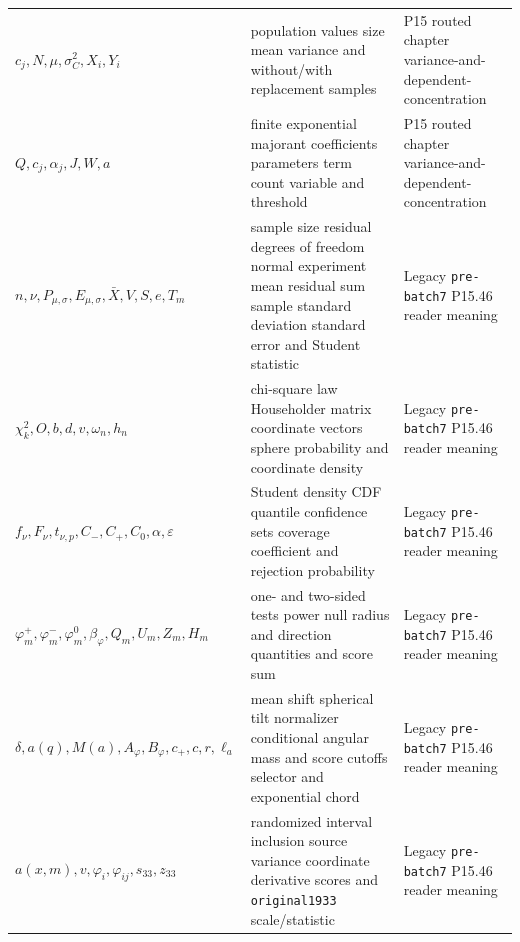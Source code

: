 \begin{longtable}{@{}p{}p{}p{}@{}}
\(c_j,\allowbreak N,\allowbreak \mu,\allowbreak \sigma_C^2,\allowbreak X_i,\allowbreak Y_i\) & population values size mean variance and without/with replacement samples & P15 routed chapter variance-\allowbreak{}and-\allowbreak{}dependent-\allowbreak{}concentration \\
\(Q,\allowbreak c_j,\allowbreak \alpha_j,\allowbreak J,\allowbreak W,\allowbreak a\) & finite exponential majorant coefficients parameters term count variable and threshold & P15 routed chapter variance-\allowbreak{}and-\allowbreak{}dependent-\allowbreak{}concentration \\
\(n,\allowbreak \nu,\allowbreak P_{\mu,\sigma},\allowbreak E_{\mu,\sigma},\allowbreak \bar X,\allowbreak V,\allowbreak S,\allowbreak e,\allowbreak T_m\) & sample size residual degrees of freedom normal experiment mean residual sum sample standard deviation standard error and Student statistic & Legacy \texttt{pre-\allowbreak{}batch7} P15.\allowbreak{}46 reader meaning \\
\(\chi_k^2,\allowbreak O,\allowbreak b,\allowbreak d,\allowbreak v,\allowbreak \omega_n,\allowbreak h_n\) & chi-square law Householder matrix coordinate vectors sphere probability and coordinate density & Legacy \texttt{pre-\allowbreak{}batch7} P15.\allowbreak{}46 reader meaning \\
\(f_\nu,\allowbreak F_\nu,\allowbreak t_{\nu,p},\allowbreak C_-,\allowbreak C_+,\allowbreak C_0,\allowbreak \alpha,\allowbreak \varepsilon\) & Student density CDF quantile confidence sets coverage coefficient and rejection probability & Legacy \texttt{pre-\allowbreak{}batch7} P15.\allowbreak{}46 reader meaning \\
\(\varphi_m^+,\allowbreak \varphi_m^-,\allowbreak \varphi_m^0,\allowbreak \beta_\varphi,\allowbreak Q_m,\allowbreak U_m,\allowbreak Z_m,\allowbreak H_m\) & one- and two-sided tests power null radius and direction quantities and score sum & Legacy \texttt{pre-\allowbreak{}batch7} P15.\allowbreak{}46 reader meaning \\
\(\delta,\allowbreak a(q),\allowbreak M(a),\allowbreak A_\varphi,\allowbreak B_\varphi,\allowbreak c_+,\allowbreak c,\allowbreak r,\allowbreak \ell_a\) & mean shift spherical tilt normalizer conditional angular mass and score cutoffs selector and exponential chord & Legacy \texttt{pre-\allowbreak{}batch7} P15.\allowbreak{}46 reader meaning \\
\(a(x,\allowbreak m),\allowbreak v,\allowbreak \varphi_i,\allowbreak \varphi_{ij},\allowbreak s_{33},\allowbreak z_{33}\) & randomized interval inclusion source variance coordinate derivative scores and \texttt{original1933} scale/statistic & Legacy \texttt{pre-\allowbreak{}batch7} P15.\allowbreak{}46 reader meaning \\

\end{longtable}
